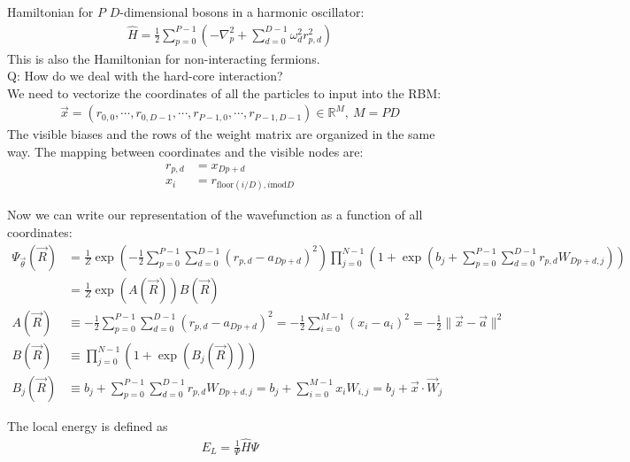 \documentclass[12pt]{article}
\begin{document}
\noindent Hamiltonian for $P$ $D$-dimensional bosons in a harmonic oscillator:
\begin{align*}
\hat{H} = \frac{1}{2} \sum_{p = 0}^{P-1} \left( -\nabla_p^2 + \sum_{d=0}^{D-1} \omega_d^2 r_{p,d}^2 \right) 
\end{align*}
\noindent This is also the Hamiltonian for non-interacting fermions. \\
\noindent Q: How do we deal with the hard-core interaction?\\

\noindent We need to vectorize the coordinates of all the particles to input into the RBM:
\begin{align*}
\vec{x} = ( r_{0,0}, \cdots, r_{0,D-1}, \cdots, r_{P-1,0}, \cdots, r_{P-1,D-1} ) \in \mathbb{R}^M, \ M = PD
\end{align*}
\noindent The visible biases and the rows of the weight matrix are organized in the same way. The mapping between coordinates and the visible nodes are:
\begin{align*}
r_{p,d} &= x_{Dp+d}\\
x_i &= r_{\text{floor}(i/D), i \text{mod} D}
\end{align*}

\noindent Now we can write our representation of the wavefunction as a function of all coordinates:
\begin{align*}
\Psi_{\vec{\theta}}(\vec{R}) &=\frac{1}{Z} \exp \left( -\frac{1}{2} \sum_{p=0}^{P-1}\sum_{d=0}^{D-1} (r_{p,d} - a_{Dp+d})^2 \right) \prod_{j=0}^{N-1} \left( 1 + \exp \left( b_j + \sum_{p=0}^{P-1}\sum_{d=0}^{D-1} r_{p,d} W_{Dp+d,j} \right) \right)\\
&= \frac{1}{Z} \exp (A(\vec{R})) B(\vec{R})\\
A(\vec{R}) &\equiv -\frac{1}{2} \sum_{p=0}^{P-1}\sum_{d=0}^{D-1} (r_{p,d} - a_{Dp+d})^2 = - \frac{1}{2}\sum_{i=0}^{M-1} (x_i-a_i)^2 = -\frac{1}{2} \| \vec{x} - \vec{a} \|^2\\
B(\vec{R}) &\equiv \prod_{j=0}^{N-1} \left( 1 + \exp \left( B_j(\vec{R}) \right) \right)\\
B_j(\vec{R}) &\equiv b_j + \sum_{p=0}^{P-1}\sum_{d=0}^{D-1} r_{p,d} W_{Dp+d,j} = b_j + \sum_{i=0}^{M-1} x_i W_{i,j} = b_j + \vec{x}\cdot \vec{W}_j
\end{align*}

\noindent The local energy is defined as
\begin{align*}
E_L = \frac{1}{\Psi} \hat{H} \Psi
\end{align*}
\end{document}
